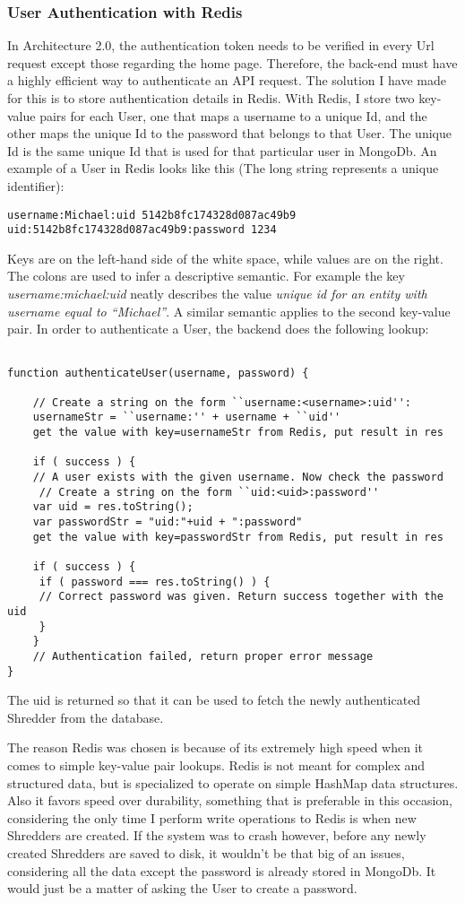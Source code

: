 \subsubsection{User Authentication with Redis}
 In Architecture 2.0, the authentication token needs to be verified in every Url request except those regarding the home page. Therefore, the back-end must have a highly efficient way to authenticate an API request. The solution I have made for this is to store authentication details in Redis. With Redis, I store two key-value pairs for each User, one that maps a username to a unique Id, and the other maps the unique Id to the password that belongs to that User. The unique Id is the same unique Id that is used for that particular user in MongoDb. An example of a User in Redis looks like this (The long string represents a unique identifier):
\begin{lstlisting}
username:Michael:uid 5142b8fc174328d087ac49b9
uid:5142b8fc174328d087ac49b9:password 1234
\end{lstlisting}
Keys are on the left-hand side of the white space, while values are on the right. The colons are used to infer a descriptive semantic. For example the key \textit{username:michael:uid} neatly describes the value \textit{unique id for an entity with username equal to ``Michael''}. A similar semantic applies to the second key-value pair. In order to authenticate a User, the backend does the following lookup:
\begin{lstlisting}

function authenticateUser(username, password) {

	// Create a string on the form ``username:<username>:uid'':
	usernameStr = ``username:'' + username + ``uid'' 
	get the value with key=usernameStr from Redis, put result in res
	
	if ( success ) {
	// A user exists with the given username. Now check the password
	 // Create a string on the form ``uid:<uid>:password''
	var uid = res.toString();
	var passwordStr = "uid:"+uid + ":password"
	get the value with key=passwordStr from Redis, put result in res
	
	if ( success ) {
	 if ( password === res.toString() ) {
	 // Correct password was given. Return success together with the uid 
	 }	
	}	
	// Authentication failed, return proper error message
} 
\end{lstlisting}
The uid is returned so that it can be used to fetch the newly authenticated Shredder from the database. 

The reason Redis was chosen is because of its extremely high speed when it comes to simple key-value pair lookups. Redis is not meant for complex and structured data, but is specialized to operate on simple HashMap data structures. Also it favors speed over durability, something that is preferable in this occasion, considering the only time I perform write operations to Redis is when new Shredders are created. If the system was to crash however, before any newly created Shredders are saved to disk, it wouldn't be that big of an issues, considering all the data except the password is already stored in MongoDb. It would just be a matter of asking the User to create a password. 


